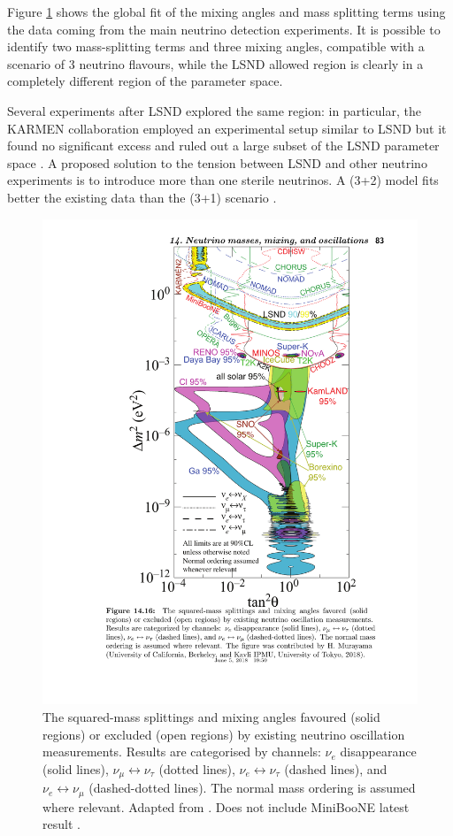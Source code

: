 Figure \ref{fig:globalfit} shows the global fit of the mixing angles and mass splitting terms using the data coming from the main neutrino detection experiments. It is possible to identify two mass-splitting terms and three mixing angles, compatible with a scenario of 3 neutrino flavours, while the LSND allowed region is clearly in a completely different region of the parameter space. 

Several experiments after LSND explored the same region: in particular, the KARMEN collaboration employed an experimental setup similar to LSND but it found no significant excess and ruled out a large subset of the LSND parameter space \cite{Eitel:2000by}. A proposed solution to the tension between LSND and other neutrino experiments is to introduce more than one sterile neutrinos. A (3+2) model fits better the existing data than the (3+1) scenario \cite{Sorel:2003hf}.

\begin{figure}[htbp]
    \centering
    \includegraphics[width=0.7\linewidth]{figures/globalfit.pdf}
    \caption{The squared-mass splittings and mixing angles favoured (solid regions) or excluded (open regions) by existing neutrino oscillation measurements. Results are categorised by channels: $\nu_e$ disappearance (solid lines), $\nu_{\mu} \leftrightarrow \nu_{\tau}$  (dotted lines), $\nu_{e} \leftrightarrow \nu_{\tau}$ (dashed lines), and $\nu_{e} \leftrightarrow \nu_{\mu}$ (dashed-dotted lines). The normal mass ordering is assumed where relevant. Adapted from \cite{PhysRevD.98.030001}. Does not include MiniBooNE latest result \cite{Aguilar-Arevalo:2018gpe}.}
    \label{fig:globalfit}
\end{figure}

